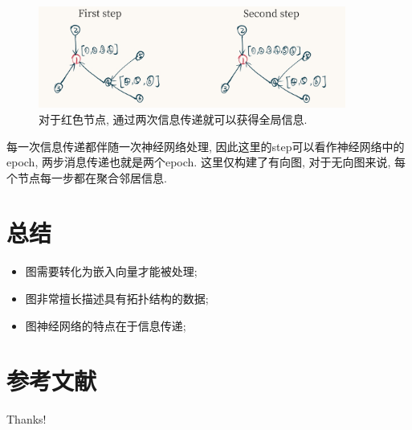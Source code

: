 \documentclass{beamer}
\begin{document}
\begin{frame}
    \begin{figure}
        \includegraphics[width=0.9\textwidth]{两步消息传递.png}
        \caption{对于红色节点, 通过两次信息传递就可以获得全局信息.}
    \end{figure}
    每一次信息传递都伴随一次神经网络处理, 因此这里的step可以看作神经网络中的epoch, 两步消息传递也就是两个epoch. 这里仅构建了有向图, 对于无向图来说, 每个节点每一步都在聚合邻居信息.
\end{frame}

\section{总结}

\begin{frame}
    \begin{itemize}
        \item 图需要转化为嵌入向量才能被处理;
        \item 图非常擅长描述具有拓扑结构的数据;
        \item 图神经网络的特点在于信息传递;
    \end{itemize}
\end{frame}

\section{参考文献}

\begin{frame} %
    
    
\end{frame}

\begin{frame}
    \begin{center}
        {\Huge\calligra Thanks!}
    \end{center}
\end{frame}
\end{document}
